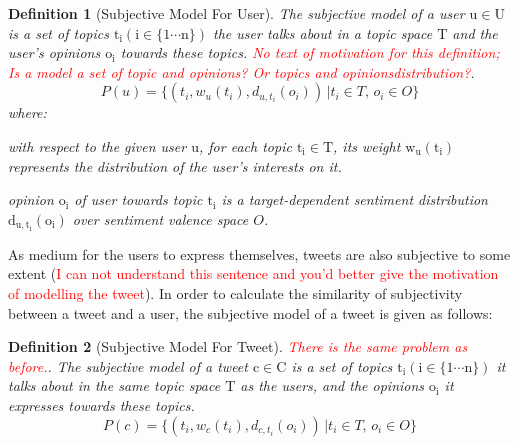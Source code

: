 \documentclass{acm_proc_article-sp}
\newtheorem{definition}{Definition}
\newcommand{\mo}[1]{\textcolor{red}{#1}}
\begin{document}
\begin{definition}[Subjective Model For User]
The subjective model of a user $\mathrm{u \in U}$ is a set of topics $\mathrm{t_{i} \left( i \in \lbrace1 \cdots n \rbrace \right) }$ 
the user talks about in a topic space $\mathrm{T}$ and the user's opinions $\mathrm{o_{i}}$ towards these topics. \mo{No text of motivation for this definition; Is a model a set of topic and opinions? Or topics and opinionsdistribution?}. 
\begin{equation}
\label{usermodel}
P \left( u \right) = \lbrace \left( t_{i}, w_{u} \left( t_{i} \right), d_{u,t_{i}} \left( o_{i} \right) \right) \,\vert  t_{i} \in T, \, o_{i} \in O \rbrace
\end{equation}
where:
\begin{itemize*}
\item with respect to the given user $\mathrm{u}$,  for each topic $\mathrm{t_{i} \in T}$, its  weight $\mathrm{ w_{u} \left( t_{i} \right)}$ represents the distribution of the user's interests on it.
\item opinion $\mathrm{o_{i}}$ of user towards topic $\mathrm{t_{i}}$ is a target-dependent sentiment distribution  $\mathrm{d_{u,t_{i}} \left( o_{i} \right)}$ over sentiment valence space $O$.
\end{itemize*}
\end{definition}

As medium for the users to express themselves, tweets are also subjective to some extent (\mo{I can not understand this sentence and you'd better give the motivation of modelling the tweet}). In order to calculate the similarity of subjectivity between a  tweet and a user, the subjective model of a tweet is given as follows:

\begin{definition}[Subjective Model For Tweet] \mo{There is the same problem as before.}. 
The subjective model of a tweet $\mathrm{c \in C}$ is a set of topics $\mathrm{t_{i} \left( i \in \lbrace1 \cdots n \rbrace \right) }$ it talks about in the same topic space $\mathrm{T}$ as the users, and the opinions $\mathrm{o_{i}}$ it expresses towards these topics.
\begin{equation}
\label{tweetmodel}
P \left( c \right) = \lbrace \left( t_{i}, w_{c} \left( t_{i} \right), d_{c,t_{i}} \left( o_{i} \right) \right) \,\vert  t_{i} \in T, \, o_{i} \in O \rbrace
\end{equation}
\end{definition}
\end{document}

